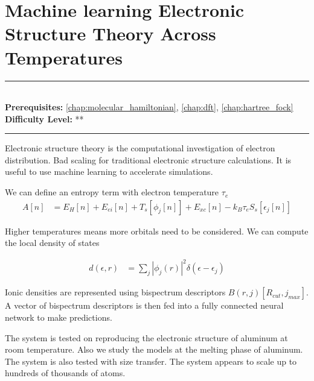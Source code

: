 \documentclass[book.tex]{subfiles}
\begin{document}
\chapter{Machine learning Electronic Structure Theory Across Temperatures}
\label{chap:deep_schrodinger}
\noindent\rule{11cm}{0.4pt} \\
\textbf{Prerequisites:} \autoref{chap:molecular_hamiltonian}, \autoref{chap:dft}, \autoref{chap:hartree_fock} \\
\textbf{Difficulty Level:} ** \\
\noindent\rule{11cm}{0.4pt}
\vspace{5mm}


Electronic structure theory is the computational investigation of electron distribution. Bad scaling for traditional electronic structure calculations. It is useful to use machine learning to accelerate simulations.

We can define an entropy term with electron temperature $\tau_e$
\begin{align}
    A[n] &= E_H[n] + E_{ei}[n] +T_s[\phi_j[n]] +E_{xc}[n] -k_B\tau_eS_s[\epsilon_j[n]]
\end{align}

Higher temperatures means more orbitals need to be considered. We can compute the local density of states

\begin{align}
    d(\epsilon, r) &= \sum_j |\phi_j(r)|^2 \delta(\epsilon - \epsilon_j)
\end{align}

Ionic densities are represented using bispectrum descriptors $B(r, j)[R_{cut}, j_{max}]$. A vector of bispectrum descriptors is then fed into a fully connected neural network to make predictions.

The system is tested on reproducing the electronic structure of aluminum at room temperature. Also we study the models at the melting phase of aluminum. The system is also tested with size transfer. The system appears to scale up to hundreds of thousands of atoms.




\end{document}
